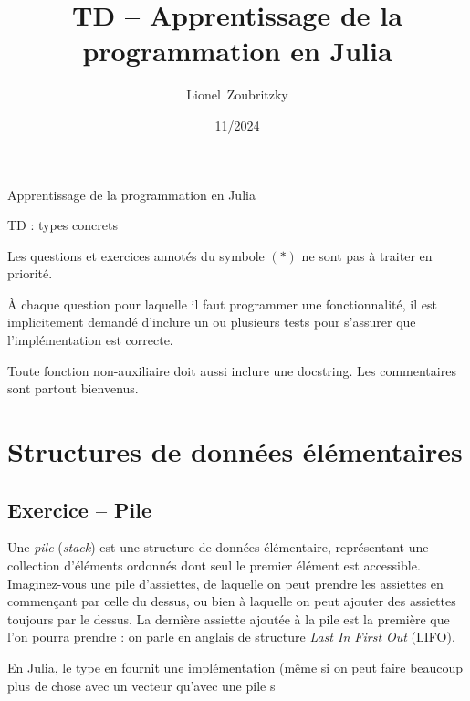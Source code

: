 \documentclass{article}
\title{TD -- Apprentissage de la programmation en Julia}
\author{Lionel~Zoubritzky}
\date{11/2024}
\newcounter{loop}
\newcounter{numEx}
\newcommand{\exo}[1]{
	\stepcounter{numEx}
	\setcounter{loop}{0}
	\subsection*{Exercice \arabic{numEx} -- #1}
}
\begin{document}
	
\begin{center}
	\Large Apprentissage de la programmation en Julia

	TD  : types concrets
	\vspace{2em}
\end{center}

Les questions et exercices annotés du symbole $(*)$ ne sont pas à traiter en priorité.

À chaque question pour laquelle il faut programmer une fonctionnalité, il est implicitement demandé d'inclure un ou plusieurs tests pour s'assurer que l'implémentation est correcte.

Toute fonction non-auxiliaire doit aussi inclure une docstring. Les commentaires sont partout bienvenus.

\section{Structures de données élémentaires}

\exo{Pile}

Une \emph{pile} (\textit{stack}) est une structure de données élémentaire, représentant une collection d'éléments ordonnés dont seul le premier élément est accessible. Imaginez-vous une pile d'assiettes, de laquelle on peut prendre les assiettes en commençant par celle du dessus, ou bien à laquelle on peut ajouter des assiettes toujours par le dessus. La dernière assiette ajoutée à la pile est la première que l'on pourra prendre : on parle en anglais de structure \textit{Last In First Out} (LIFO).

En Julia, le type  en fournit une implémentation (même si on peut faire beaucoup plus de chose avec un vecteur qu'avec une pile s
\end{document}
